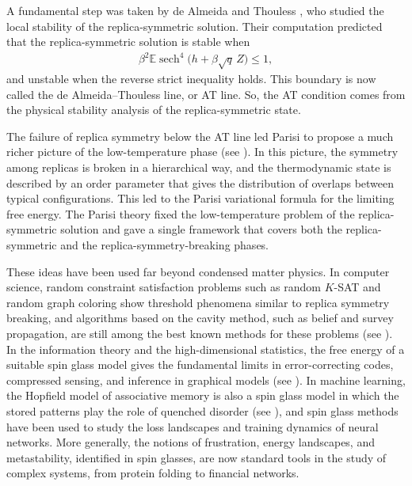 \documentclass[11pt]{article}
\numberwithin{equation}{section}
\newcommand{\1}{\mathbf 1}
\begin{document}
A fundamental step was taken by de Almeida and Thouless \cite{deAlmeidaThouless1978}, who studied the local stability of the replica-symmetric solution. 
Their computation predicted that the replica-symmetric solution is  stable when
\begin{align}
    \label{eq: AT region}
\beta^2\mathbb E\operatorname{sech}^4\bigl(h+\beta\sqrt q\,Z\bigr)\leq 1,
\end{align}
and unstable when the reverse strict inequality holds. This boundary is now called the de Almeida--Thouless line, or AT line. So, the AT condition comes from the physical stability analysis of the replica-symmetric state.

The failure of replica symmetry below the AT line led Parisi to propose a much richer picture of the low-temperature phase (see \cite{Parisi1979,Parisi1980}). In this picture, the symmetry among replicas is broken in a hierarchical way, and the thermodynamic state is described by an order parameter that gives the distribution of overlaps between typical configurations. This led to the Parisi variational formula for the limiting free energy. The Parisi theory fixed the low-temperature problem of the replica-symmetric solution and gave a single framework that covers both the replica-symmetric and the replica-symmetry-breaking phases.

These ideas have been used far beyond condensed matter physics. In computer science, random constraint satisfaction problems such as random $K$-SAT and random graph coloring show threshold phenomena similar to replica symmetry breaking, and algorithms based on the cavity method, such as belief and survey propagation, are still among the best known methods for these problems (see \cite{MezardParisiZecchina2002,MezardMontanari2009}). In the information theory and the high-dimensional statistics, the free energy of a suitable spin glass model gives the fundamental limits in error-correcting codes, compressed sensing, and inference in graphical models (see \cite{Nishimori2001,ZdeborovaKrzakala2016}). In machine learning, the Hopfield model of associative memory is also a spin glass model in which the stored patterns play the role of quenched disorder (see \cite{Hopfield1982}), and spin glass methods have been used to study the loss landscapes and training dynamics of neural networks. More generally, the notions of frustration, energy landscapes, and metastability, identified in spin glasses, are now standard tools in the study of complex systems, from protein folding to financial networks.
\end{document}
